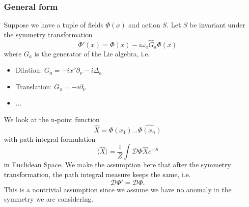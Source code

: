 \documentclass[a4paper,11pt]{article}
\begin{document}
\subsubsection{General form}
Suppose we have a tuple of fields $\Phi(x)$ and action $S$. Let $S$ be invariant under the symmetry transformation
\begin{equation}
    \Phi'(x)=\Phi(x)-i\omega_a\hat{G}_a\Phi(x)
\end{equation}
where $G_a$ is the generator of the Lie algebra, i.e.
\begin{itemize}
    \item Dilation: $G_a=-ix^\nu\partial_\nu-i\Delta_a$
    \item Translation: $G_a=-i\partial_\nu$
    \item ...
\end{itemize}
We look at the n-point function
\begin{equation}
    \hat{X}=\hat{\Phi(x_1)}...\hat{\Phi(x_n)}
\end{equation}
with path integral formulation
\begin{equation}
    \langle\hat{X}\rangle=\frac{1}{Z}\int\mathcal{D}\Phi\hat{X}e^{-S}
\end{equation}
in Euclidean Space. We make the assumption here that after the symmetry transformation, the path integral measure keeps the same, i.e.
\begin{equation}
    \mathcal{D}\Phi'=\mathcal{D}\Phi.
\end{equation}
This is a nontrivial assumption since we assume we have no anomaly in the symmetry we are considering.
\end{document}
